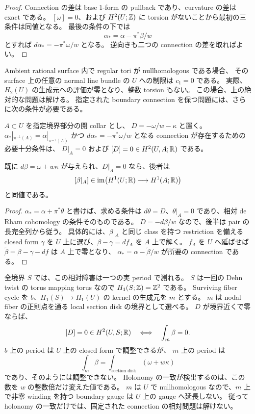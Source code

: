 \begin{proof}
Connection の差は base $1$-form の pullback であり、curvature の差は exact である。
$[\omega]=0$、および $H^2(U;\mathbb Z)$ に torsion がないことから最初の三条件は同値となる。
最後の条件の下では
\[
 \alpha_* = \alpha-\pi^*\beta/w
\]
とすれば $d\alpha_*=-\pi^*\omega/w$ となる。
逆向きも二つの connection の差を取ればよい。
\end{proof}

Ambient rational surface 内で regular tori が nullhomologous である場合、
その surface 上の任意の normal line bundle の $U$ への制限は $c_1=0$ である。
実際、$H_2(U)$ の生成元への評価が零となり、整数 torsion もない。
この場合、上の絶対的な問題は解ける。
指定された boundary connection を保つ問題には、さらに次の条件が必要である。

\begin{proposition}
\label{mc:relative-curvature}
$A\subset U$ を指定境界部分の開 collar とし、
$D=-\omega/w-\kappa$ と置く。
$\alpha_*|_{\pi^{-1}(A)}=\alpha|_{\pi^{-1}(A)}$ かつ
$d\alpha_*=-\pi^*\omega/w$ となる connection が存在するための必要十分条件は、
$D|_A=0$ および $[D]=0\in H^2(U,A;\mathbb R)$ である。

既に $d\beta=\omega+w\kappa$ が与えられ、$D|_A=0$ なら、後者は
\[
 [\beta|_A]\in
 \operatorname{im}\bigl(H^1(U;\mathbb R)\longrightarrow H^1(A;\mathbb R)\bigr)
\]
と同値である。
\end{proposition}

\begin{proof}
$\alpha_* =\alpha+\pi^*\theta$ と書けば、求める条件は
$d\theta=D$、$\theta|_A=0$ であり、相対 de Rham cohomology の条件そのものである。
$D=-d\beta/w$ なので、後半は pair の長完全列から従う。
具体的には、$\beta|_A$ と同じ class を持つ restriction を備える closed form
$\gamma$ を $U$ 上に選び、$\beta-\gamma=df_A$ を $A$ 上で解く。
$f_A$ を $U$ へ延ばせば $\widetilde\beta=\beta-\gamma-df$ は $A$ 上で零となり、
$\alpha_* =\alpha-\widetilde\beta/w$ が所要の connection である。
\end{proof}

全境界 $S$ では、この相対障害は一つの実 period で測れる。
$S$ は一回の Dehn twist の torus mapping torus なので $H_1(S;\mathbb Z)=\mathbb Z^2$ である。
Surviving fiber cycle を $b$、$H_1(S)\to H_1(U)$ の kernel の生成元を $m$ とする。
$m$ は nodal fiber の正則点を通る local section disk の境界として選べる。
$D$ が境界近くで零ならば、
\[
 [D]=0\in H^2(U,S;\mathbb R)
 \quad\Longleftrightarrow\quad
 \int_m\beta=0.
\]
$b$ 上の period は $U$ 上の closed form で調整できるが、
$m$ 上の period は
\[
 \int_m\beta=\int_{\text{section disk}}(\omega+w\kappa)
\]
であり、そのようには調整できない。
Holonomy の一致が検出するのは、この数を $w$ の整数倍だけ変えた値である。
$m$ は $U$ で nullhomologous なので、$m$ 上で非零 winding を持つ boundary gauge は
$U$ 上の gauge へ延長しない。
従って holonomy の一致だけでは、固定された connection の相対問題は解けない。


